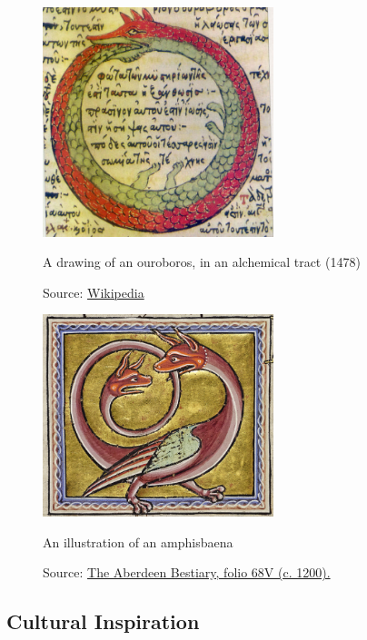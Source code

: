 \begin{uomappendix}
                \begin{figure}[h]
                    \centering
                    \includegraphics[width=0.6\textwidth]{images/Ouroborus.jpg}
                    \caption{A drawing of an ouroboros, in an alchemical tract (1478)}
                    \label{fig:ouroboros}
                    \caption*{Source: \href{https://en.wikipedia.org/wiki/File:Serpiente_alquimica.jpg}{Wikipedia}}
                \end{figure}
    
                \begin{figure}[H]
                    \centering
                    \includegraphics[width=0.6\textwidth]{images/Amphisbaena.png}
                    \caption{An illustration of an amphisbaena}
                    \label{fig:amphisbaena}
                    \caption*{Source: \href{https://www.abdn.ac.uk/bestiary/ms24/f68v}{The Aberdeen Bestiary, folio 68V (c. 1200).}}
                \end{figure}
    
            \subsection{Cultural Inspiration} \label{app:Cult}
    

\end{uomappendix}
